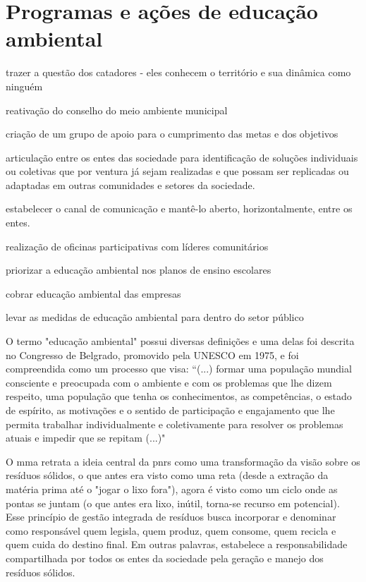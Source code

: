 \FloatBarrier
\newpage
\section{Programas e ações de educação ambiental}
\label{sec:educ_amb}
trazer a questão dos catadores - eles conhecem o território e sua dinâmica como ninguém

reativação do conselho do meio ambiente municipal

criação de um grupo de apoio para o cumprimento das metas e dos objetivos

articulação entre os entes das sociedade para identificação de soluções individuais ou coletivas que por ventura já sejam realizadas e que possam ser replicadas ou adaptadas em outras comunidades e setores da sociedade.

estabelecer o canal de comunicação e mantê-lo aberto, horizontalmente, entre os entes.

realização de oficinas participativas com líderes comunitários

priorizar a educação ambiental nos planos de ensino escolares

cobrar educação ambiental das empresas

levar as medidas de educação ambiental para dentro do setor público


\label{sec:educ_amb}
O termo "educação ambiental" possui diversas definições e uma delas foi descrita no Congresso de Belgrado, promovido pela UNESCO em 1975, e foi compreendida como um processo que visa: “(...) formar uma população mundial consciente e preocupada com o ambiente e com os problemas que lhe dizem respeito, uma população que tenha os conhecimentos, as competências, o estado de espírito, as motivações e o sentido de participação e engajamento que lhe permita trabalhar individualmente e coletivamente para resolver os problemas atuais e impedir que se repitam (...)" 

O \gls{mma} retrata a ideia central da \gls{pnrs} como uma transformação da visão sobre os resíduos sólidos, o que antes era visto como uma reta (desde a extração da matéria prima até o "jogar o lixo fora"), agora é visto como um ciclo onde as pontas se juntam (o que antes era lixo, inútil, torna-se recurso em potencial). Esse princípio de gestão integrada de resíduos busca incorporar e denominar como responsável quem legisla, quem produz, quem consome, quem recicla e quem cuida do destino final. Em outras palavras, estabelece a responsabilidade compartilhada por todos os entes da sociedade pela geração e manejo dos resíduos sólidos. 

